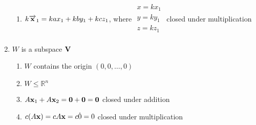 \documentclass[12pt]{article}
\begin{document}
\begin{enumerate}
\begin{enumerate}
      \item $k\overrightarrow{\bold{x}}_1=kax_1+kby_1+kcz_1$, where $\begin{array}{c} x=kx_1\\y=ky_1\\z=kz_1\\\end{array}$ closed under multiplication \textcolor{green}{\checkmark}

    \end{enumerate}

    \setcounter{enumi}{53}

  \item $W$ is a subspace $\bold{V}$

    \begin{enumerate}

      \item $W$ contains the origin $(0,0,\dots,0)$ \textcolor{green}{\checkmark}

      \item $W\leq\mathbb{R}^n$ \textcolor{green}{\checkmark}

      \item $A\bold{x}_1+A\bold{x}_2=\bold{0}+\bold{0}=\bold{0}$ closed under addition \textcolor{green}{\checkmark}

      \item $c(A\bold{x})=cA\bold{x}=c\dot0=0$ closed under multiplication \textcolor{green}{\checkmark}

    \end{enumerate}

\end{enumerate}
\end{document}
